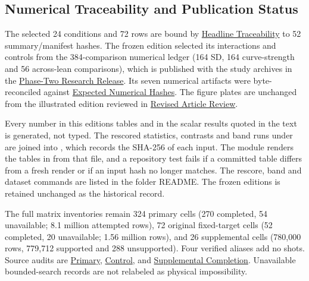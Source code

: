 \documentclass[11pt,letterpaper]{article}
\begin{document}
\subsection{Numerical Traceability and Publication Status}

The selected 24 conditions and 72 rows are bound by \href{phase2/validation/selected_headline_traceability_v1/review.json}{Headline Traceability} to 52 summary/manifest hashes. The frozen edition selected its interactions and controls from the 384-comparison numerical ledger (164 SD, 164 curve-strength and 56 across-lean comparisons), which is published with the study archives in the \href{https://github.com/D-sorganization/UpstreamDrift/releases/tag/shot-pattern-phase2-research-2026-10-10}{Phase-Two Research Release}. Its seven numerical artifacts were byte-reconciled against \href{phase2/validation/protocol_name_recovery_v6/expected_numeric_hashes.json}{Expected Numerical Hashes}. The figure plates are unchanged from the illustrated edition reviewed in \href{phase2/validation/illustrated_article_v2/review.json}{Revised Article Review}.

Every number in this edition\textquotesingle s tables and in the scalar results quoted in the text is generated, not typed. The rescored statistics, contrasts and \BandVariantRuns{} band runs under  are joined into , which records the SHA-256 of each input. The module  renders the tables in  from that file, and a repository test fails if a committed table differs from a fresh render or if an input hash no longer matches. The rescore, band and dataset commands are listed in the folder README. The frozen edition\textquotesingle s  is retained unchanged as the historical record.

The full matrix inventories remain 324 primary cells (270 completed, 54 unavailable; 8.1 million attempted rows), 72 original fixed-target cells (52 completed, 20 unavailable; 1.56 million rows), and 26 supplemental cells (780,000 rows, 779,712 supported and 288 unsupported). Four verified aliases add no shots. Source audits are \href{phase2/validation/independent_primary_final_audit.json}{Primary}, \href{phase2/validation/independent_control_final_audit.json}{Control}, and \href{phase2/validation/supplement_final_completion.json}{Supplemental Completion}. Unavailable bounded-search records are not relabeled as physical impossibility.
\end{document}
